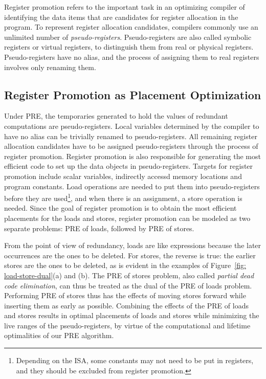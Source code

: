 Register promotion refers to the important task in an optimizing compiler
of identifying the data items that are candidates for register allocation 
in the program.  To represent register allocation candidates, compilers
commonly use an unlimited number of \emph{pseudo-registers}.  Pseudo-registers
are also called symbolic registers or virtual registers, to distinguish them
from real or physical registers.  Pseudo-registers have no alias, and the
process of assigning them to real registers involves only renaming them.

\subsection{Register Promotion as Placement Optimization}

Under PRE, the temporaries generated to hold the values of redundant 
computations are pseudo-registers.  Local variables determined by the compiler
to have no alias can be trivially renamed to pseudo-registers.   All remaining
register allocation candidates have to be assigned pseudo-registers through 
the process of register promotion.  Register promotion is also responsible
for generating the most efficient code to set up the data objects in
pseudo-registers.  Targets for register promotion include scalar variables,
indirectly accessd memory locations and program constants.  
Load operations are needed to put them into pseudo-registers before
they are used\footnote{Depending on the ISA, some constants may not need to be
put in registers, and they should be excluded from register promotion.}, and
when there is an assignment, a store operation is needed.  Since the goal of
register promotion is to obtain the most efficient placements for the loads and
stores, register promotion can be modeled as two separate problems: PRE of 
loads, followed by PRE of stores.

From the point of view of redundancy, loads are like expressions because the
later occurrences are the ones to be deleted.  For stores, the reverse is true:
the earlier stores are the ones to be deleted, as is evident in the examples
of Figure~\ref{fig: load-store-dual}(a) and (b).  The PRE of stores problem,
also called \emph{partial dead code elimination}, can thus be treated as the
dual of the PRE of loads problem.  Performing PRE of stores thus has the effects
of moving stores forward while inserting them as early as possible.  
Combining the effects of the PRE of loads and stores results in optimal
placements of loads and stores while minimizing the live ranges of the
pseudo-registers, by virtue of the computational and lifetime optimalities
of our PRE algorithm.

